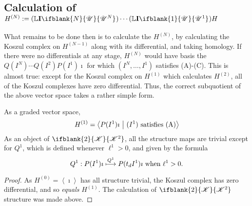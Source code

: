 \documentclass[10pt]{article}
\newcommand{\LL}[1]{\ifblank{#1}{\scrK}{\scrK^{#1}}}
\newcommand{\nontop}[1]{\ifblank{#1}{\scrU}{\scrU^{#1}}}
\newcommand{\Ind}[2][]{\mathbf{I}{#2}_{#1}}%
\newcommand{\derived}{\mathbb{L}}
\renewcommand{\Q}{Q}
\begin{document}
\begin{CalculatingRepeatedKoszul}
\subsection{Calculation of $H^{(N)}:=(\derived\Ind{\nontop{N}})\cdots (\derived\Ind{\nontop{1}})H$}

What remains to be done then is to calculate the $H^{(N)}$, by calculating the Koszul complex on $H^{(N-1)}$ along with its differential, and taking homology. If there were no differentials at any stage, $H^{(N)}$ would have basis the $\Q(I^N)\cdots \Q(I^2)P(I^1)\imath$ for which $(I^N,\ldots,I^1)$ satisfies \textup{(A)}-\textup{(C)}. This is almost true: except for the Koszul complex on $H^{(1)}$ which calculates $H^{(2)}$, all of the Koszul complexes have zero differential. Thus, the correct subquotient of the above vector space takes a rather simple form.




\begin{prop}
As a graded vector space,
\[H^{(1)}=\left\langle P(I^1)\imath\ \middle|\ (I^1)\textup{ satisfies \textup{(A)}}\right\rangle\]
As an object of $\LL{2}$, all the structure maps are trivial except for $\Q^1$, which is defined whenever $\ell^1>0$, and given by the formula
\[\Q^1:P(I^1)\imath\overset{\Q^1}{\mapsto} P(t_dI^1)\imath\textup{ when $\ell^1>0$}.\]
\end{prop}
\begin{proof}
As $H^{(0)}=\left\langle \imath\right\rangle$ has all structure trivial, the Koszul complex has zero differential, and so \emph{equals} $H^{(1)}$. The calculation of $\LL{2}$ structure was made above.
\end{proof}


\end{CalculatingRepeatedKoszul}
\end{document}
